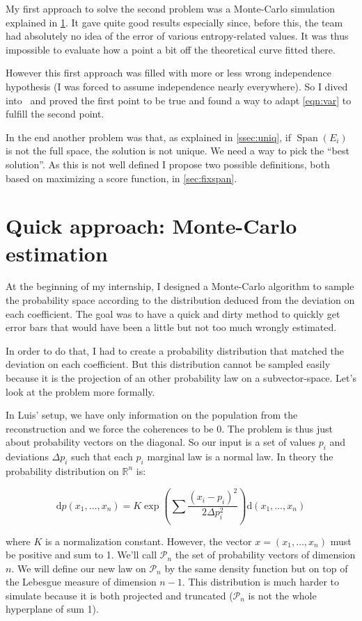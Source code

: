 \documentclass[10pt,a4paper]{report}
\theoremstyle{plain}
\theoremstyle{definition}
\theoremstyle{remark}
\newcommand{\R}{\ensuremath{\mathbb{R}}}
\newcommand{\dd}{\mathrm{d}}
\DeclareMathOperator{\Span}{Span}
\begin{document}
My first approach to solve the second problem was a Monte-Carlo simulation
explained in \cref{sec:MC}. It gave quite good results especially since,
before this, the team had absolutely no idea of the error of various
entropy-related values. It was thus impossible to evaluate how a point a
bit off the theoretical curve fitted there.

However this first approach was filled with more or less wrong independence
hypothesis (I was forced to assume independence nearly everywhere). So I dived
into~\cite{SPRAL17} and proved the first point to be true and found a way to
adapt \cref{eqn:var} to fulfill the second point.

In the end another problem was that, as explained in \cref{ssec:uniq}, if
$\Span(E_i)$ is not the full space, the solution is not unique. We need a way to
pick the ``best solution''. As this is not well defined I propose two possible
definitions, both based on maximizing a score function, in \cref{sec:fixspan}.

\section{Quick approach: Monte-Carlo estimation}\label{sec:MC}

At the beginning of my internship, I designed a Monte-Carlo algorithm to sample
the probability space according to the distribution deduced from the deviation on
each coefficient. The goal was to have a quick and dirty method to quickly get
error bars that would have been a little but not too much wrongly estimated.

In order to do that, I had to create a probability distribution that matched the
deviation on each coefficient. But this distribution
cannot be sampled easily because it is the projection of an other probability law on a
subvector-space. Let's look at the problem more formally.

In Luis' setup, we have only information on the
population from the reconstruction and we force the coherences to be 0.
The problem is thus just about probability vectors on the diagonal.
So our input is a set of values
$p_i$ and deviations $\Delta p_i$ such that each $p_i$ marginal law is a normal
law. In theory the probability distribution on $\R^n$ is:

\[\dd p(x_1,\ldots,x_n) = K \exp\left(\sum \frac{(x_i - p_i)^2}{2\Delta p_i^2}
  \right) \dd(x_1,\ldots,x_n)\]

where $K$ is a normalization constant. However, the vector $x =(x_1,\ldots,x_n)$
must be positive and sum to 1. We'll call $\mathcal{P}_n$ the set of probability
vectors of dimension $n$. We will define our new law on $\mathcal{P}_n$ by the
same density function but on top of the Lebesgue measure of dimension $n-1$.
This distribution is much harder to simulate because it is both projected and
truncated ($\mathcal{P}_n$ is not the whole hyperplane of sum 1).
\end{document}

